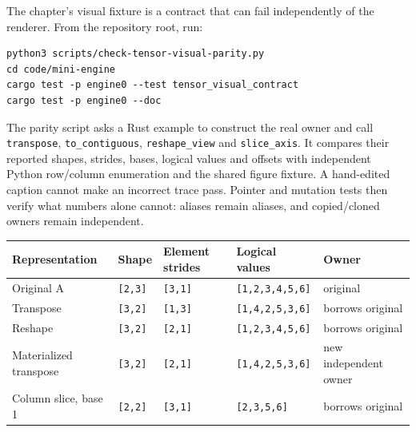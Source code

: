 The chapter's visual fixture is a contract that can fail independently
of the renderer. From the repository root, run:

\begin{verbatim}
python3 scripts/check-tensor-visual-parity.py
cd code/mini-engine
cargo test -p engine0 --test tensor_visual_contract
cargo test -p engine0 --doc
\end{verbatim}

The parity script asks a Rust example to construct the real owner and
call \texttt{transpose}, \texttt{to\_contiguous}, \texttt{reshape\_view}
and \texttt{slice\_axis}. It compares their reported shapes, strides,
bases, logical values and offsets with independent Python row/column
enumeration and the shared figure fixture. A hand-edited caption cannot
make an incorrect trace pass. Pointer and mutation tests then verify
what numbers alone cannot: aliases remain aliases, and copied/cloned
owners remain independent.


{\def\LTcaptype{none} %
\begin{longtable}[]{@{}
  >{\raggedright\arraybackslash}p{}
  >{\raggedright\arraybackslash}p{}
  >{\raggedright\arraybackslash}p{}
  >{\raggedright\arraybackslash}p{}
  >{\raggedright\arraybackslash}p{}@{}}
\toprule\noalign{}
\begin{minipage}[b]{\linewidth}\raggedright
Representation
\end{minipage} & \begin{minipage}[b]{\linewidth}\raggedright
Shape
\end{minipage} & \begin{minipage}[b]{\linewidth}\raggedright
Element strides
\end{minipage} & \begin{minipage}[b]{\linewidth}\raggedright
Logical values
\end{minipage} & \begin{minipage}[b]{\linewidth}\raggedright
Owner
\end{minipage} \\
\midrule\noalign{}
\endhead
\bottomrule\noalign{}
\endlastfoot
Original A & \texttt{{[}2,3{]}} & \texttt{{[}3,1{]}} &
\texttt{{[}1,2,3,4,5,6{]}} & original \\
Transpose & \texttt{{[}3,2{]}} & \texttt{{[}1,3{]}} &
\texttt{{[}1,4,2,5,3,6{]}} & borrows original \\
Reshape & \texttt{{[}3,2{]}} & \texttt{{[}2,1{]}} &
\texttt{{[}1,2,3,4,5,6{]}} & borrows original \\
Materialized transpose & \texttt{{[}3,2{]}} & \texttt{{[}2,1{]}} &
\texttt{{[}1,4,2,5,3,6{]}} & new independent owner \\
Column slice, base 1 & \texttt{{[}2,2{]}} & \texttt{{[}3,1{]}} &
\texttt{{[}2,3,5,6{]}} & borrows original \\
\end{longtable}
}

